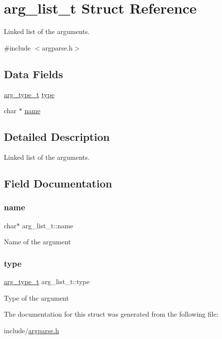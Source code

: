\hypertarget{structarg__list__t}{}\section{arg\+\_\+list\+\_\+t Struct Reference}
\label{structarg__list__t}


Linked list of the arguments.  




{\ttfamily \#include $<$argparse.\+h$>$}

\subsection*{Data Fields}
\begin{DoxyCompactItemize}
\item 
\hyperlink{argparse_8h_a41933758bc61936be1063a3fdb08f1c1}{arg\+\_\+type\+\_\+t} \hyperlink{structarg__list__t_a3356ca2f2e86a326f6a0cf296c3e8369}{type}
\item 
char $\ast$ \hyperlink{structarg__list__t_a489bda4d2758d450770ff76a0049197d}{name}
\end{DoxyCompactItemize}


\subsection{Detailed Description}
Linked list of the arguments. 

\subsection{Field Documentation}
\mbox{\label{structarg__list__t_a489bda4d2758d450770ff76a0049197d}} 
\subsubsection{\texorpdfstring{name}{name}}
{\footnotesize\ttfamily char$\ast$ arg\+\_\+list\+\_\+t\+::name}

Name of the argument \mbox{\label{structarg__list__t_a3356ca2f2e86a326f6a0cf296c3e8369}} 
\subsubsection{\texorpdfstring{type}{type}}
{\footnotesize\ttfamily \hyperlink{argparse_8h_a41933758bc61936be1063a3fdb08f1c1}{arg\+\_\+type\+\_\+t} arg\+\_\+list\+\_\+t\+::type}

Type of the argument 

The documentation for this struct was generated from the following file\+:\begin{DoxyCompactItemize}
\item 
include/\hyperlink{argparse_8h}{argparse.\+h}\end{DoxyCompactItemize}
